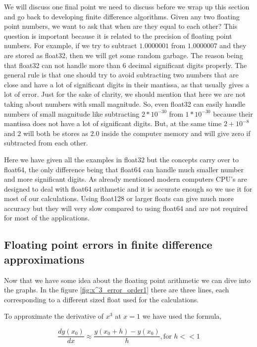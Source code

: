 We will discuss one final point we need to discuss before we wrap up this section and go back to developing finite difference algorithms. Given any two floating point numbers, we want to ask that when are they equal to each other?
This question is important because it is related to the precision of floating point numbers. For example, if we try to subtract $1.0000001$ from $1.0000007$ and they are stored as float32, then we will get some random garbage. The reason being that float32 can not handle more than 6 decimal significant digits properly.
The general rule is that one should try to avoid subtracting two numbers that are close and have a lot of significant digits in their mantissa, as that usually gives a lot of error.
Just for the sake of clarity, we should mention that here we are not taking about numbers with small magnitude. So, even float32 can easily handle numbers of small magnitude like subtracting $2*10^{-30}$ from $1*10^{-30}$ because their mantissa does not have a lot of significant digits. But, at the same time $2 + 10^{-8}$ and $2$ will both be stores as $2.0$ inside the computer memory and will give zero if subtracted from each other.


Here we have given all the examples in float32 but the concepts carry over to float64, the only difference being that float64 can handle much smaller number and more significant digits. As already mentioned modern computers CPU's are designed to deal with float64 arithmetic and it is accurate enough so we use it for most of our calculations. Using float128 or larger floats can give much more accuracy but they will very slow compared to using float64 and are not required for most of the applications.

\subsection{Floating point errors in finite difference approximations}

Now that we have some idea about the floating point arithmetic we can dive into the graphs.
In the figure \ref{fig:x^3_error_order1} there are three lines, each corresponding to a different sized float used for the calculations.

To approximate the derivative of $x^3$ at $x=1$ we have used the formula,

\begin{equation}
    \frac{dy(x_0)}{dx} \approx \frac{y(x_0 + h) - y(x_0)}{h} , \text{for } h << 1
    \label{eq:first_order_2}
\end{equation}

